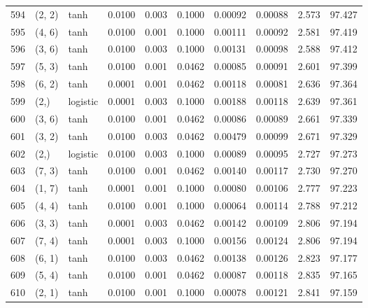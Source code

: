 \begin{tabular}{lllrrrrrrr}
594 &      (2, 2) &      tanh &  0.0100 &  0.003 &  0.1000 &          0.00092 &    0.00088 &       2.573 &    97.427 \\
595 &      (4, 6) &      tanh &  0.0100 &  0.001 &  0.1000 &          0.00111 &    0.00092 &       2.581 &    97.419 \\
596 &      (3, 6) &      tanh &  0.0100 &  0.003 &  0.1000 &          0.00131 &    0.00098 &       2.588 &    97.412 \\
597 &      (5, 3) &      tanh &  0.0100 &  0.001 &  0.0462 &          0.00085 &    0.00091 &       2.601 &    97.399 \\
598 &      (6, 2) &      tanh &  0.0001 &  0.001 &  0.0462 &          0.00118 &    0.00081 &       2.636 &    97.364 \\
599 &        (2,) &  logistic &  0.0001 &  0.003 &  0.1000 &          0.00188 &    0.00118 &       2.639 &    97.361 \\
600 &      (3, 6) &      tanh &  0.0100 &  0.001 &  0.0462 &          0.00086 &    0.00089 &       2.661 &    97.339 \\
601 &      (3, 2) &      tanh &  0.0100 &  0.003 &  0.0462 &          0.00479 &    0.00099 &       2.671 &    97.329 \\
602 &        (2,) &  logistic &  0.0100 &  0.003 &  0.1000 &          0.00089 &    0.00095 &       2.727 &    97.273 \\
603 &      (7, 3) &      tanh &  0.0100 &  0.001 &  0.0462 &          0.00140 &    0.00117 &       2.730 &    97.270 \\
604 &      (1, 7) &      tanh &  0.0001 &  0.001 &  0.1000 &          0.00080 &    0.00106 &       2.777 &    97.223 \\
605 &      (4, 4) &      tanh &  0.0100 &  0.001 &  0.1000 &          0.00064 &    0.00114 &       2.788 &    97.212 \\
606 &      (3, 3) &      tanh &  0.0001 &  0.003 &  0.0462 &          0.00142 &    0.00109 &       2.806 &    97.194 \\
607 &      (7, 4) &      tanh &  0.0001 &  0.003 &  0.1000 &          0.00156 &    0.00124 &       2.806 &    97.194 \\
608 &      (6, 1) &      tanh &  0.0100 &  0.003 &  0.0462 &          0.00138 &    0.00126 &       2.823 &    97.177 \\
609 &      (5, 4) &      tanh &  0.0100 &  0.001 &  0.0462 &          0.00087 &    0.00118 &       2.835 &    97.165 \\
610 &      (2, 1) &      tanh &  0.0100 &  0.001 &  0.1000 &          0.00078 &    0.00121 &       2.841 &    97.159 \\

\end{tabular}
